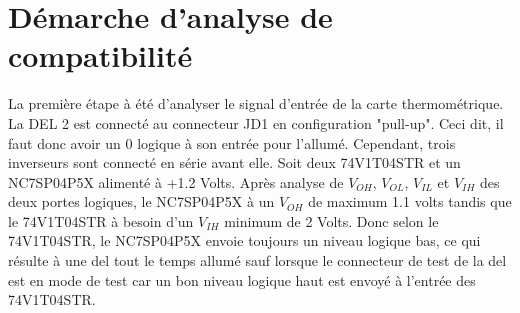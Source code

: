 \documentclass[a11paper]{article}
\begin{document}
\section{Démarche d'analyse de compatibilité}
La première étape à été d'analyser le signal d'entrée de la carte thermométrique. La DEL 2 est connecté au connecteur JD1 en
configuration "pull-up". Ceci dit, il faut donc avoir un 0 logique à son entrée pour l'allumé. Cependant, trois inverseurs sont
connecté en série avant elle. Soit deux 74V1T04STR et un NC7SP04P5X alimenté à +1.2 Volts. Après analyse de $V_{OH}$, $V_{OL}$, $V_{IL}$
et $V_{IH}$ des deux portes logiques, le NC7SP04P5X à un $V_{OH}$ de maximum 1.1 volts tandis que le 74V1T04STR à besoin d'un $V_{IH}$
minimum de 2 Volts. Donc selon le 74V1T04STR, le NC7SP04P5X envoie toujours un niveau logique bas, ce qui résulte à une del
tout le temps allumé sauf lorsque le connecteur de test de la del est en mode de test car un bon niveau logique haut est envoyé à
l'entrée des 74V1T04STR.


\end{document}
